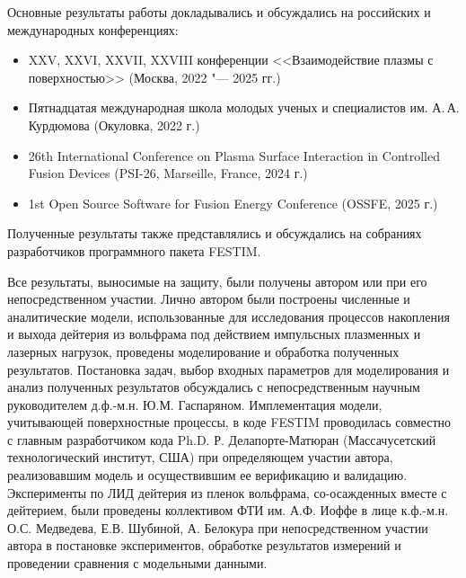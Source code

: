{\probation}
Основные результаты работы докладывались и обсуждались на российских и международных конференциях:
\begin{itemize}
    \item XXV, XXVI, XXVII, XXVIII конференции <<Взаимодействие плазмы с поверхностью>> (Москва, 2022 "--- 2025 гг.)
    \item Пятнадцатая международная школа молодых ученых и специалистов им. А.\,А. Курдюмова (Окуловка, 2022 г.)
    \item 26th International Conference on Plasma Surface Interaction in Controlled Fusion Devices (PSI-26, Marseille, France, 2024 г.)
    \item 1st Open Source Software for Fusion Energy Conference (OSSFE, 2025 г.)
\end{itemize}
Полученные результаты также представлялись и обсуждались на собраниях разработчиков программного пакета FESTIM. 

{\contribution} Все результаты, выносимые на защиту, были получены автором или при его непосредственном участии. Лично автором были построены численные и аналитические модели, использованные для исследования процессов накопления и выхода дейтерия из вольфрама под действием импульсных плазменных и лазерных нагрузок, проведены моделирование и обработка полученных результатов. Постановка задач, выбор входных параметров для моделирования и анализ полученных результатов обсуждались с непосредственным научным руководителем д.ф.-м.н. Ю.М. Гаспаряном. Имплементация модели, учитывающей поверхностные процессы, в коде FESTIM проводилась совместно с главным разработчиком кода Ph.D. Р. Делапорте-Матюран (Массачусетский технологический институт, США) при определяющем участии автора, реализовавшим модель и осуществившим ее верификацию и валидацию. Эксперименты по ЛИД дейтерия из пленок вольфрама, со-осажденных вместе с дейтерием, были проведены коллективом ФТИ им. А.Ф. Иоффе в лице к.ф.-м.н. О.С. Медведева, Е.В. Шубиной, А. Белокура при непосредственном участии автора в постановке экспериментов, обработке результатов измерений и проведении сравнения с модельными данными.

